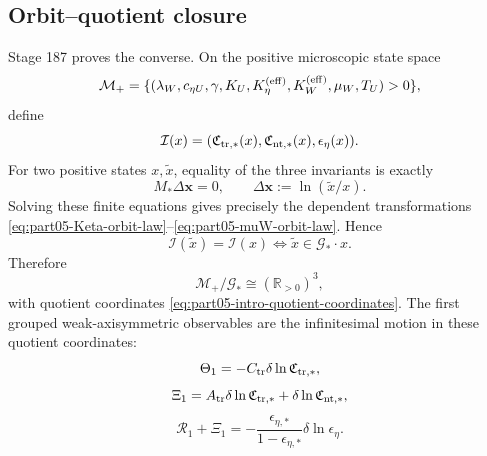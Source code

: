 \subsection{Orbit--quotient closure}
Stage 187 proves the converse.  On the positive microscopic state space
\begin{equation}
\label{eq:part05-positive-state-space}
\mathcal M_+
=
\{(\lambda_W,c_{\eta U},\gamma,K_U,K_\eta^{({\rm eff})},K_W^{({\rm eff})},\mu_W,T_U)>0\},
\end{equation}
define
\begin{equation}
\label{eq:part05-invariant-map}
\mathcal I(x)
=
(\mathfrak C_{{\rm tr},*}(x),\mathfrak C_{{\rm nt},*}(x),\epsilon_\eta(x)).
\end{equation}
For two positive states \(x,\widetilde x\), equality of the three invariants is exactly
\begin{equation}
\label{eq:part05-finite-fibre-equations}
M_*\Delta\mathbf x=0,
\qquad
\Delta\mathbf x:=\ln(\widetilde x/x).
\end{equation}
Solving these finite equations gives precisely the dependent transformations \eqref{eq:part05-Keta-orbit-law}--\eqref{eq:part05-muW-orbit-law}.  Hence
\begin{equation}
\label{eq:part05-orbit-fibre-theorem}
\mathcal I(\widetilde x)=\mathcal I(x)
\iff
\widetilde x\in\mathcal G_*\cdot x.
\end{equation}
Therefore
\begin{equation}
\label{eq:part05-quotient-space}
\mathcal M_+/\mathcal G_*
\cong
(\mathbb R_{>0})^3,
\end{equation}
with quotient coordinates \eqref{eq:part05-intro-quotient-coordinates}.  The first grouped weak-axisymmetric observables are the infinitesimal motion in these quotient coordinates:
\begin{equation}
\label{eq:part05-observables-quotient}
\Theta_1=-C_{\rm tr}\delta\ln\mathfrak C_{{\rm tr},*},
\end{equation}
\begin{equation}
\label{eq:part05-Xi-quotient}
\Xi_1=A_{\rm tr}\delta\ln\mathfrak C_{{\rm tr},*}+\delta\ln\mathfrak C_{{\rm nt},*},
\end{equation}
\begin{equation}
\label{eq:part05-R-quotient}
\mathcal R_1+\Xi_1
=-\frac{\epsilon_{\eta,*}}{1-\epsilon_{\eta,*}}\delta\ln\epsilon_\eta.
\end{equation}

